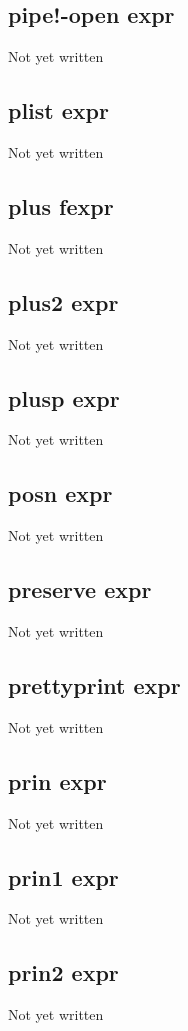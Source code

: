\documentclass[a4paper,11pt]{article}
\begin{document}
{\subsection{\ttfamily pipe!-open expr}
   Not yet written

\subsection{\ttfamily plist expr}
   Not yet written

\subsection{\ttfamily plus fexpr}
   Not yet written

\subsection{\ttfamily plus2 expr}
   Not yet written

\subsection{\ttfamily plusp expr}
   Not yet written

\subsection{\ttfamily posn expr}
   Not yet written

\subsection{\ttfamily preserve expr}
   Not yet written

\subsection{\ttfamily prettyprint expr}
   Not yet written

\subsection{\ttfamily prin expr}
   Not yet written

\subsection{\ttfamily prin1 expr}
   Not yet written

\subsection{\ttfamily prin2 expr}
   Not yet written

}
\end{document}

